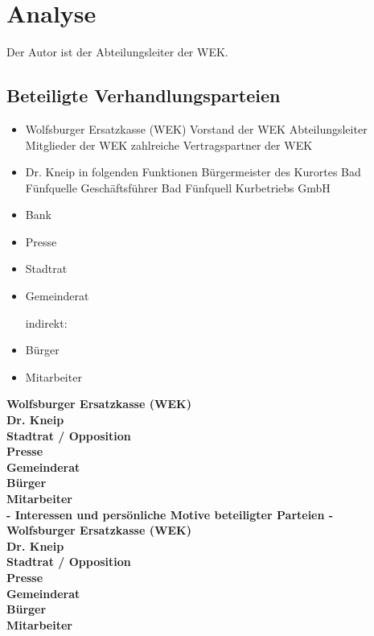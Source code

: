 \chapter{Analyse}
Der Autor ist der Abteilungsleiter der WEK.
\section{Beteiligte Verhandlungsparteien}
	
\begin{itemize}
	\item Wolfsburger Ersatzkasse (WEK)
    	\subitem Vorstand der WEK
    	\subitem Abteilungsleiter
		\subitem Mitglieder der WEK
		\subitem zahlreiche Vertragspartner der WEK
    
	\item Dr. Kneip in folgenden Funktionen
		\subitem Bürgermeister des Kurortes Bad Fünfquelle
		\subitem Geschäftsführer Bad Fünfquell Kurbetriebs GmbH
    
    \item Bank
    \item Presse
    \item Stadtrat
	\item Gemeinderat 
    
    indirekt:
	\item Bürger	
	\item Mitarbeiter
\end{itemize}

\smallskip \textbf{Wolfsburger Ersatzkasse (WEK)} \\
\smallskip \textbf{Dr. Kneip} \\
\smallskip \textbf{Stadtrat / Opposition} \\
\smallskip \textbf{Presse} \\
\smallskip \textbf{Gemeinderat} \\
\smallskip \textbf{Bürger} \\
\smallskip \textbf{Mitarbeiter} \\

\smallskip \textbf{- Interessen und persönliche Motive beteiligter Parteien -} \\
\smallskip \textbf{Wolfsburger Ersatzkasse (WEK)} \\
\smallskip \textbf{Dr. Kneip} \\
\smallskip \textbf{Stadtrat / Opposition} \\
\smallskip \textbf{Presse} \\
\smallskip \textbf{Gemeinderat} \\
\smallskip \textbf{Bürger} \\
\smallskip \textbf{Mitarbeiter} \\

